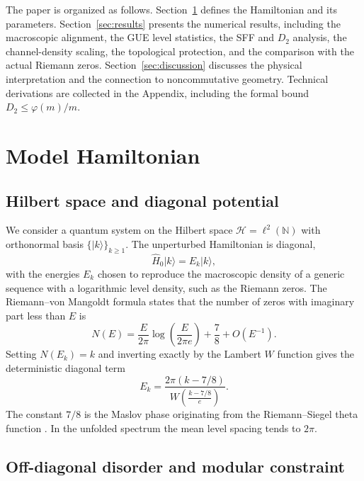 \documentclass[11pt,a4paper]{article}
\newcommand{\Hilb}{\mathcal{H}}
\begin{document}
The paper is organized as follows. Section~\ref{sec:model} defines the Hamiltonian and its parameters. Section~\ref{sec:results} presents the numerical results, including the macroscopic alignment, the GUE level statistics, the SFF and $D_2$ analysis, the channel-density scaling, the topological protection, and the comparison with the actual Riemann zeros. Section~\ref{sec:discussion} discusses the physical interpretation and the connection to noncommutative geometry. Technical derivations are collected in the Appendix, including the formal bound $D_2 \le \varphi(m)/m$.

\section{Model Hamiltonian}
\label{sec:model}

\subsection{Hilbert space and diagonal potential}

We consider a quantum system on the Hilbert space $\Hilb = \ell^2(\mathbb{N})$ with orthonormal basis $\{|k\rangle\}_{k\ge 1}$. The unperturbed Hamiltonian is diagonal,
\begin{equation}
\hat H_0 |k\rangle = E_k |k\rangle,
\end{equation}
with the energies $E_k$ chosen to reproduce the macroscopic density of a generic sequence with a logarithmic level density, such as the Riemann zeros. The Riemann--von Mangoldt formula states that the number of zeros with imaginary part less than $E$ is
\begin{equation}
N(E) = \frac{E}{2\pi}\log\left(\frac{E}{2\pi e}\right) + \frac{7}{8} + O(E^{-1}).
\end{equation}
Setting $N(E_k)=k$ and inverting exactly by the Lambert $W$ function gives the deterministic diagonal term
\begin{equation}
\boxed{ E_k = \frac{2\pi (k - 7/8)}{W\!\left(\frac{k-7/8}{e}\right)} }.
\label{eq:diag}
\end{equation}
The constant $7/8$ is the Maslov phase originating from the Riemann--Siegel theta function \cite{Corless1996}. In the unfolded spectrum the mean level spacing tends to $2\pi$.

\subsection{Off-diagonal disorder and modular constraint}
\end{document}
